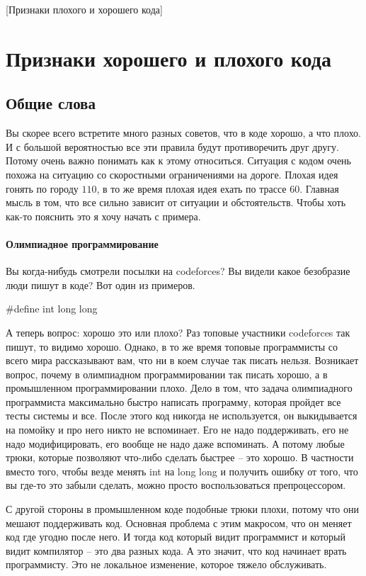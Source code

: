 [Признаки плохого и хорошего кода]


\section{Признаки хорошего и плохого кода}

\subsection{Общие слова}

Вы скорее всего встретите много разных советов, что в коде хорошо, а что плохо.
И с большой вероятностью все эти правила будут противоречить друг другу.
Потому очень важно понимать как к этому относиться.
Ситуация с кодом очень похожа на ситуацию со скоростными ограничениями на дороге.
Плохая идея гонять по городу $110$, в то же время плохая идея ехать по трассе $60$.
Главная мысль в том, что все сильно зависит от ситуации и обстоятельств.
Чтобы хоть как-то пояснить это я хочу начать с примера.

\paragraph{Олимпиадное программирование}

Вы когда-нибудь смотрели посылки на codeforces?
Вы видели какое безобразие люди пишут в коде?
Вот один из примеров.
\begin{cppcode}
#define int long long
\end{cppcode}
А теперь вопрос: хорошо это или плохо?
Раз топовые участники codeforces так пишут, то видимо хорошо.
Однако, в то же время топовые программисты со всего мира рассказывают вам, что ни в коем случае так писать нельзя.
Возникает вопрос, почему в олимпиадном программировании так писать хорошо, а в промышленном программировании плохо.
Дело в том, что задача олимпиадного программиста максимально быстро написать программу, которая пройдет все тесты системы и все.
После этого код никогда не используется, он выкидывается на помойку и про него никто не вспоминает.
Его не надо поддерживать, его не надо модифицировать, его вообще не надо даже вспоминать.
А потому любые трюки, которые позволяют что-либо сделать быстрее -- это хорошо.
В частности вместо того, чтобы везде менять int на long long и получить ошибку от того, что вы где-то это забыли сделать, можно просто воспользоваться препроцессором.

С другой стороны в промышленном коде подобные трюки плохи, потому что они мешают поддерживать код.
Основная проблема с этим макросом, что он меняет код где угодно после него.
И тогда код который видит программист и который видит компилятор -- это два разных кода.
А это значит, что код начинает врать программисту.
Это не локальное изменение, которое тяжело обслуживать.

